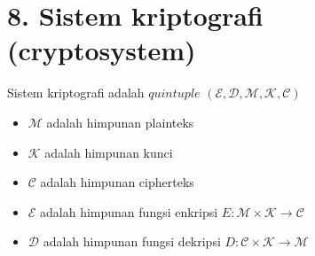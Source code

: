 \documentclass{article}
\begin{document}

\section*{8. Sistem kriptografi (cryptosystem)}

Sistem kriptografi adalah $quintuple$ $(\mathcal{E}, \mathcal{D}, \mathcal{M}, \mathcal{K}, \mathcal{C})$
\begin{itemize}
    \item $\mathcal{M}$ adalah himpunan plainteks
    \item $\mathcal{K}$ adalah himpunan kunci
    \item $\mathcal{C}$ adalah himpunan cipherteks
    \item $\mathcal{E}$ adalah himpunan fungsi enkripsi $E: \mathcal{M} \times \mathcal{K} \to \mathcal{C}$
    \item $\mathcal{D}$ adalah himpunan fungsi dekripsi $D: \mathcal{C} \times \mathcal{K} \to \mathcal{M}$
\end{itemize}
\end{document}
